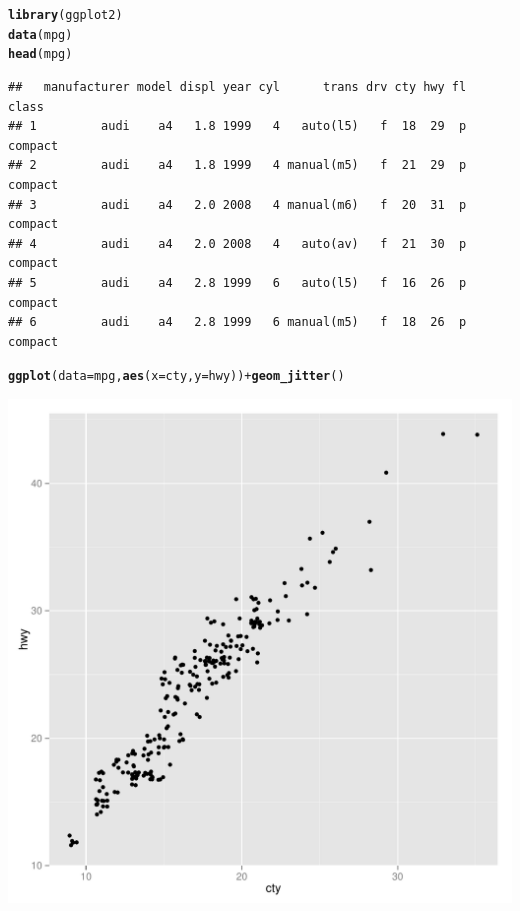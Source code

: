 \documentclass{article}\usepackage[]{graphicx}\usepackage[]{color}
\makeatletter
\def\maxwidth{ %
  \ifdim\Gin@nat@width>\linewidth
    \linewidth
  \else
    \Gin@nat@width
  \fi
}
\newcommand{\hlopt}[1]{\textcolor[rgb]{0,0,0}{#1}}%
\newcommand{\hlstd}[1]{\textcolor[rgb]{0.345,0.345,0.345}{#1}}%
\newcommand{\hlkwc}[1]{\textcolor[rgb]{0.333,0.667,0.333}{#1}}%
\newcommand{\hlkwd}[1]{\textcolor[rgb]{0.737,0.353,0.396}{\textbf{#1}}}%
\newenvironment{kframe}{%
 \def\at@end@of@kframe{}%
 \ifinner\ifhmode%
  \def\at@end@of@kframe{\end{minipage}}%
  \begin{minipage}{\columnwidth}%
 \fi\fi%
 \def\FrameCommand##1{\hskip\@totalleftmargin \hskip-\fboxsep
 \colorbox{shadecolor}{##1}\hskip-\fboxsep
     \hskip-\linewidth \hskip-\@totalleftmargin \hskip\columnwidth}%
 \MakeFramed {\advance\hsize-\width
   \@totalleftmargin\z@ \linewidth\hsize
   \@setminipage}}%
 {\par\unskip\endMakeFramed%
 \at@end@of@kframe}
\newenvironment{knitrout}{}{} %
\makeatother
\begin{document}
\begin{knitrout}
\color{fgcolor}\begin{kframe}
\begin{alltt}
\hlkwd{library}\hlstd{(ggplot2)}
\hlkwd{data}\hlstd{(mpg)}
\hlkwd{head}\hlstd{(mpg)}
\end{alltt}
\begin{verbatim}
##   manufacturer model displ year cyl      trans drv cty hwy fl   class
## 1         audi    a4   1.8 1999   4   auto(l5)   f  18  29  p compact
## 2         audi    a4   1.8 1999   4 manual(m5)   f  21  29  p compact
## 3         audi    a4   2.0 2008   4 manual(m6)   f  20  31  p compact
## 4         audi    a4   2.0 2008   4   auto(av)   f  21  30  p compact
## 5         audi    a4   2.8 1999   6   auto(l5)   f  16  26  p compact
## 6         audi    a4   2.8 1999   6 manual(m5)   f  18  26  p compact
\end{verbatim}
\end{kframe}
\end{knitrout}

\begin{knitrout}
\color{fgcolor}\begin{kframe}
\begin{alltt}
\hlkwd{ggplot}\hlstd{(}\hlkwc{data} \hlstd{= mpg,} \hlkwd{aes}\hlstd{(}\hlkwc{x} \hlstd{= cty,} \hlkwc{y} \hlstd{= hwy))} \hlopt{+} \hlkwd{geom_jitter}\hlstd{()}
\end{alltt}
\end{kframe}
\includegraphics[width=\maxwidth]{figure/explo1-1} 

\end{knitrout}
\end{document}
